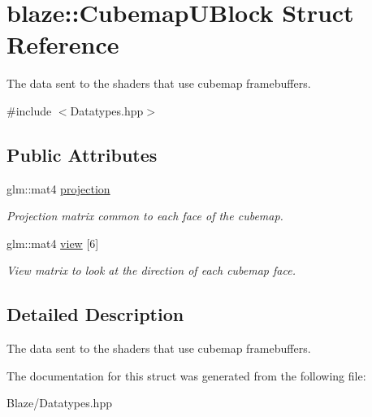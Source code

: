 \hypertarget{structblaze_1_1CubemapUBlock}{}\section{blaze\+:\+:Cubemap\+U\+Block Struct Reference}
\label{structblaze_1_1CubemapUBlock}


The data sent to the shaders that use cubemap framebuffers.  




{\ttfamily \#include $<$Datatypes.\+hpp$>$}

\subsection*{Public Attributes}
\begin{DoxyCompactItemize}
\item 
\mbox{\label{structblaze_1_1CubemapUBlock_a89986f38443ea9702fbb7447bb179f9e}} 
glm\+::mat4 \hyperlink{structblaze_1_1CubemapUBlock_a89986f38443ea9702fbb7447bb179f9e}{projection}
\begin{DoxyCompactList}\small\item\em Projection matrix common to each face of the cubemap. \end{DoxyCompactList}\item 
\mbox{\label{structblaze_1_1CubemapUBlock_a7f6deb9dd4af76642567e5b522c7dac0}} 
glm\+::mat4 \hyperlink{structblaze_1_1CubemapUBlock_a7f6deb9dd4af76642567e5b522c7dac0}{view} \mbox{[}6\mbox{]}
\begin{DoxyCompactList}\small\item\em View matrix to look at the direction of each cubemap face. \end{DoxyCompactList}\end{DoxyCompactItemize}


\subsection{Detailed Description}
The data sent to the shaders that use cubemap framebuffers. 

The documentation for this struct was generated from the following file\+:\begin{DoxyCompactItemize}
\item 
Blaze/Datatypes.\+hpp\end{DoxyCompactItemize}
